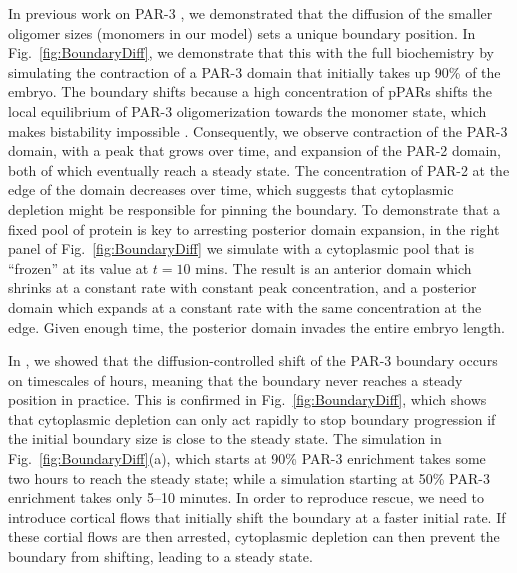 \documentclass[11pt]{article}
\newcommand{\6}[1]{#1_{\text{6}}}
\newcommand{\3}[1]{#1_{\text{3}}}
\begin{document}
In previous work on PAR-3 \cite{lang2023oligomerization}, we demonstrated that the diffusion of the smaller oligomer sizes (monomers in our model) sets a unique boundary position. In Fig.\ \ref{fig:BoundaryDiff}, we demonstrate that this with the full biochemistry by simulating the contraction of a PAR-3 domain that initially takes up 90\% of the embryo. The boundary shifts because a high concentration of pPARs shifts the local equilibrium of PAR-3 oligomerization towards the monomer state, which makes bistability impossible \cite{lang2023oligomerization}. Consequently, we observe contraction of the PAR-3 domain, with a peak that grows over time, and expansion of the PAR-2 domain, both of which eventually reach a steady state. The concentration of PAR-2 at the edge of the domain decreases over time, which suggests that cytoplasmic depletion might be responsible for pinning the boundary. To demonstrate that a fixed pool of protein is key to arresting posterior domain expansion, in the right panel of Fig.\ \ref{fig:BoundaryDiff} we simulate with a cytoplasmic pool that is ``frozen'' at its value at $t = 10$ mins. The result is an anterior domain which shrinks at a constant rate with constant peak concentration, and a posterior domain which expands at a constant rate with the same concentration at the edge. Given enough time, the posterior domain invades the entire embryo length. 

In \cite{lang2023oligomerization}, we showed that the diffusion-controlled shift of the PAR-3 boundary occurs on timescales of hours, meaning that the boundary never reaches a steady position in practice. This is confirmed in Fig.\ \ref{fig:BoundaryDiff}, which shows that cytoplasmic depletion can only act rapidly to stop boundary progression if the initial boundary size is close to the steady state. The simulation in Fig.\ \ref{fig:BoundaryDiff}(a), which starts at 90\% PAR-3 enrichment takes some two hours to reach the steady state; while a simulation starting at 50\% PAR-3 enrichment takes only 5--10 minutes. In order to reproduce rescue, we need to introduce cortical flows that initially shift the boundary at a faster initial rate. If these cortial flows are then arrested, cytoplasmic depletion can then prevent the boundary from shifting, leading to a steady state.
\end{document}
